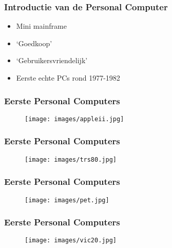 \documentclass[aspectratio=43]{uva-inf-presentation}
\begin{document}

\begin{frame}
\frametitle{Introductie van de Personal Computer}

\begin{itemize}
\item Mini mainframe
\item `Goedkoop'
\item `Gebruikersvriendelijk'
\item Eerste echte PCs rond 1977-1982
\end{itemize}

\end{frame}


\begin{frame}
\frametitle{Eerste Personal Computers}

\begin{figure}
\texttt{[image: images/appleii.jpg]}
\end{figure}

\end{frame}


\begin{frame}
\frametitle{Eerste Personal Computers}

\begin{figure}
\texttt{[image: images/trs80.jpg]}
\end{figure}

\end{frame}


\begin{frame}
\frametitle{Eerste Personal Computers}

\begin{figure}
\texttt{[image: images/pet.jpg]}
\end{figure}

\end{frame}


\begin{frame}
\frametitle{Eerste Personal Computers}

\begin{figure}
\texttt{[image: images/vic20.jpg]}
\end{figure}

\end{frame}
\end{document}
